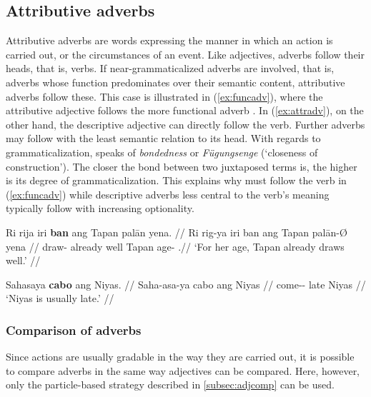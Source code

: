 \subsection{Attributive adverbs}

Attributive adverbs are words expressing the manner in which an action is 
carried out, or the circumstances of an event. Like adjectives, adverbs follow 
their heads, that is, verbs. If near-grammaticalized adverbs are involved, that 
is, adverbs whose function predominates over their semantic content, 
attributive adverbs follow these. This case is illustrated in 
(\ref{ex:funcadv}), where the attributive adjective  
follows the more functional adverb . In 
(\ref{ex:attradv}), on the other hand, the descriptive adjective 
 can directly follow the verb. Further adverbs may 
follow with the least semantic relation to its head. With regards to 
grammaticalization, \citet[157\psqq]{lehmann2015} speaks of \emph{bondedness} 
or \emph{Fügungsenge} (`closeness of construction'). The closer the bond 
between two juxtaposed terms is, the higher is its degree of 
grammaticalization. This explains why  must follow the verb in 
(\ref{ex:funcadv}) while descriptive adverbs less central to the verb's meaning 
typically follow with increasing optionality.

\pex
\a\label{ex:funcadv}\begingl
	\gla Ri rija iri \textbf{ban} ang Tapan palān yena. //
	\glb Ri rig-ya iri ban ang Tapan palān-Ø yena //
	\glc \InsT{} draw-\TsgM{} already well \Aarg{} Tapan age-\Top{} 
		\TsgF{}.\Gen //
	\glft `For her age, Tapan already draws well.' //
\endgl

\a\label{ex:attradv}\begingl
	\gla Sahasaya \textbf{cabo} ang Niyas. //
	\glb Saha-asa-ya cabo ang Niyas //
	\glc come-\Hab{}-\TsgM{} late \Aarg{} Niyas //
	\glft `Niyas is usually late.' //
\endgl

\xe

\subsubsection{Comparison of adverbs}

Since actions are usually gradable in the way they are carried out, it is 
possible to compare adverbs in the same way adjectives can be compared. Here, 
however, only the particle-based strategy described in \autoref{subsec:adjcomp} 
can be used.


